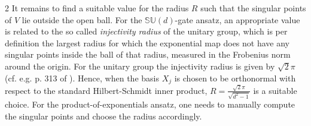 \documentclass{article}
\begin{document}
\begin{multicols}{2}
It remains to find a suitable value for the radius \(R\) such that the singular points of \(V\) lie outside the open ball.
For the \(\mathbb{SU}(d)\)-gate ansatz, an appropriate value is related to the so called \textit{injectivity radius} of the unitary group, which is per definition the largest radius for which the exponential map does not have any singular points inside the ball of that radius, measured in the Frobenius norm around the origin. For the unitary group the injectivity radius is given by \(\sqrt{2} \pi\) (cf. e.g. p. 313 of \cite{hilgert_structure_2012}).
Hence, when the basis \(X_j\) is chosen to be orthonormal with respect to the standard Hilbert-Schmidt inner product, \(R = \frac{\sqrt{2} \pi}{\sqrt{d^2-1}}\) is a suitable choice.
For the product-of-exponentials ansatz, one needs to manually compute the singular points and choose the radius accordingly.


\end{multicols}
\end{document}
